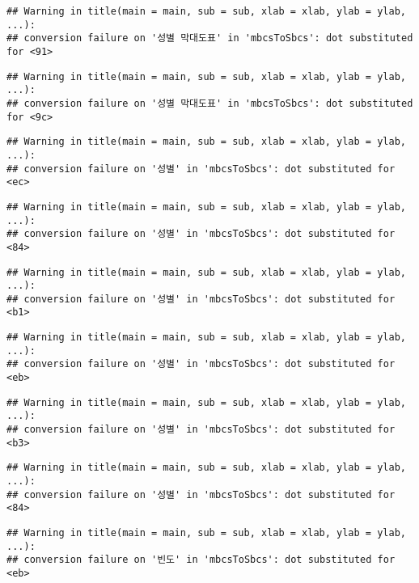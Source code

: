 \documentclass[
]{article}
\begin{document}
\begin{verbatim}
## Warning in title(main = main, sub = sub, xlab = xlab, ylab = ylab, ...):
## conversion failure on '성별 막대도표' in 'mbcsToSbcs': dot substituted for <91>
\end{verbatim}

\begin{verbatim}
## Warning in title(main = main, sub = sub, xlab = xlab, ylab = ylab, ...):
## conversion failure on '성별 막대도표' in 'mbcsToSbcs': dot substituted for <9c>
\end{verbatim}

\begin{verbatim}
## Warning in title(main = main, sub = sub, xlab = xlab, ylab = ylab, ...):
## conversion failure on '성별' in 'mbcsToSbcs': dot substituted for <ec>
\end{verbatim}

\begin{verbatim}
## Warning in title(main = main, sub = sub, xlab = xlab, ylab = ylab, ...):
## conversion failure on '성별' in 'mbcsToSbcs': dot substituted for <84>
\end{verbatim}

\begin{verbatim}
## Warning in title(main = main, sub = sub, xlab = xlab, ylab = ylab, ...):
## conversion failure on '성별' in 'mbcsToSbcs': dot substituted for <b1>
\end{verbatim}

\begin{verbatim}
## Warning in title(main = main, sub = sub, xlab = xlab, ylab = ylab, ...):
## conversion failure on '성별' in 'mbcsToSbcs': dot substituted for <eb>
\end{verbatim}

\begin{verbatim}
## Warning in title(main = main, sub = sub, xlab = xlab, ylab = ylab, ...):
## conversion failure on '성별' in 'mbcsToSbcs': dot substituted for <b3>
\end{verbatim}

\begin{verbatim}
## Warning in title(main = main, sub = sub, xlab = xlab, ylab = ylab, ...):
## conversion failure on '성별' in 'mbcsToSbcs': dot substituted for <84>
\end{verbatim}

\begin{verbatim}
## Warning in title(main = main, sub = sub, xlab = xlab, ylab = ylab, ...):
## conversion failure on '빈도' in 'mbcsToSbcs': dot substituted for <eb>
\end{verbatim}
\end{document}
